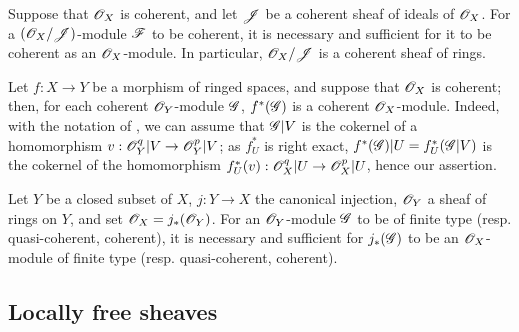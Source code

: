 \begin{env}[5.3.10]
\label{0.5.3.10}
Suppose that $\mathscr{O}_X$ is coherent, and let $\mathscr{J}$ be a coherent sheaf of ideals of $\mathscr{O}_X$.
For a $(\mathscr{O}_X/\mathscr{J})$-module $\mathscr{F}$ to be coherent, it is necessary and sufficient for it to be coherent as an $\mathscr{O}_X$-module.
In particular, $\mathscr{O}_X/\mathscr{J}$ is a coherent sheaf of rings.
\end{env}

\begin{env}[5.3.11]
\label{0.5.3.11}
Let $f:X\to Y$ be a morphism of ringed spaces, and suppose that $\mathscr{O}_X$ is coherent;
then, for each coherent $\mathscr{O}_Y$-module $\mathscr{G}$, $f^*(\mathscr{G})$ is a coherent $\mathscr{O}_X$-module.
Indeed, with the notation of , we can assume that $\mathscr{G}|V$ is the cokernel of a homomorphism $v:\sh{O}_Y^q|V\to\sh{O}_Y^p|V$;
as $f_U^*$ is right exact, $f^*(\mathscr{G})|U=f_U^*(\mathscr{G}|V)$ is the cokernel of the homomorphism $f_U^*(v):\sh{O}_X^q|U\to\sh{O}_X^p|U$, hence our assertion.
\end{env}

\begin{env}[5.3.12]
\label{0.5.3.12}
Let $Y$ be a closed subset of $X$, $j:Y\to X$ the canonical injection, $\mathscr{O}_Y$ a sheaf of rings on $Y$, and set $\mathscr{O}_X=j_*(\mathscr{O}_Y)$.
For an $\mathscr{O}_Y$-module $\mathscr{G}$ to be of finite type (resp. quasi-coherent, coherent), it is necessary and sufficient for $j_*(\mathscr{G})$ to be an $\mathscr{O}_X$-module of finite type (resp. quasi-coherent, coherent).
\end{env}

\subsection{Locally free sheaves}
\label{subsection:0.5.4}


